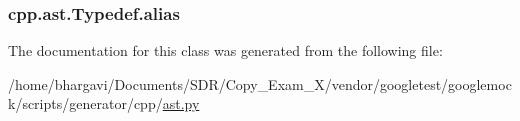 \subsubsection[{\texorpdfstring{alias}{alias}}]{\setlength{\rightskip}{0pt plus 5cm}cpp.\+ast.\+Typedef.\+alias}\hypertarget{classcpp_1_1ast_1_1_typedef_a3187a504dfbefe50b866b44902823c30}{}\label{classcpp_1_1ast_1_1_typedef_a3187a504dfbefe50b866b44902823c30}


The documentation for this class was generated from the following file\+:\begin{DoxyCompactItemize}
\item 
/home/bhargavi/\+Documents/\+S\+D\+R/\+Copy\+\_\+\+Exam\+\_\+X/vendor/googletest/googlemock/scripts/generator/cpp/\hyperlink{ast_8py}{ast.\+py}\end{DoxyCompactItemize}
